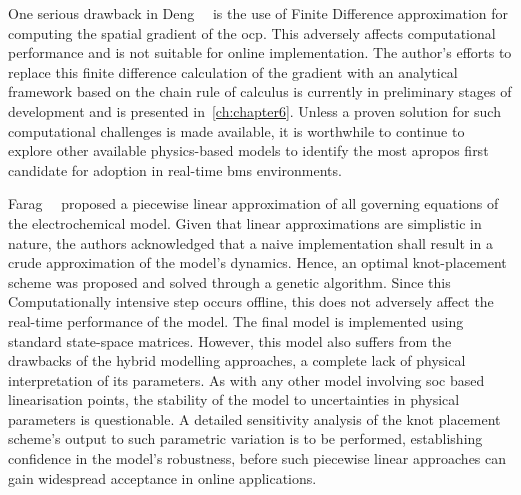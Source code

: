 

One  serious  drawback in  Deng~\etal{}~\cite{Deng2018}  is  the use  of  Finite
Difference approximation  for computing the  spatial gradient of  the \gls{ocp}.
This  adversely  affects  computational  performance and  is  not  suitable  for
online implementation.  The author's efforts  to replace this  finite difference
calculation of  the gradient  with an  analytical framework  based on  the chain
rule  of calculus  is  currently in  preliminary stages  of  development and  is
presented in~\cref{ch:chapter6}. Unless a proven solution for such computational
challenges is  made available,  it is  worthwhile to  continue to  explore other
available physics-based models to identify  the most apropos first candidate for
adoption in real-time \gls{bms} environments.


Farag~\etal{}~\cite{Farag2017}  proposed  a  piecewise linear  approximation  of
all  governing  equations  of  the  electrochemical  model.  Given  that  linear
approximations are simplistic  in nature, the authors acknowledged  that a naive
implementation shall  result in a  crude approximation of the  model's dynamics.
Hence,  an optimal  knot-placement  scheme  was proposed  and  solved through  a
genetic  algorithm. Since  this Computationally  intensive step  occurs offline,
this does not adversely affect the real-time performance of the model. The final
model is  implemented using standard  state-space matrices. However,  this model
also suffers  from the  drawbacks of  the hybrid  modelling approaches,  \ie{} a
complete lack  of physical interpretation of  its parameters. As with  any other
model involving \gls{soc} based linearisation points, the stability of the model
to uncertainties in physical parameters  is questionable. A detailed sensitivity
analysis of the  knot placement scheme's output to such  parametric variation is
to  be performed,  establishing  confidence in  the  model's robustness,  before
such  piecewise  linear approaches  can  gain  widespread acceptance  in  online
applications.





